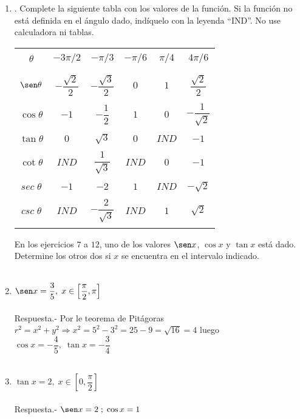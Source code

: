\begin{enumerate}
\item . Complete la siguiente tabla con los valores de la función. Si la función no está definida en el ángulo dado, indíquelo con la leyenda “IND”. No use calculadora ni tablas.
    \begin{center}
	\begin{tabular}{cccccc}
	    \hline\\
	    $\theta$&$-3\pi/2$&$-\pi/3$&$-\pi/6$&$\pi/4$&$4\pi/6$\\\\
	    \hline\\
	    $\sen \theta$&$-\dfrac{\sqrt{2}}{2}$&$-\dfrac{\sqrt{3}}{2}$&$0$&$1$&$\dfrac{\sqrt{2}}{2}$\\\\
	    $\cos \theta$&$-1$&$-\dfrac{1}{2}$&$1$&$0$&$-\dfrac{1}{\sqrt{2}}$\\\\
	    $\tan \theta$&$0$&$\sqrt{3}$&$0$&$IND$&$-1$\\\\
	    $\cot \theta$&$IND$&$\dfrac{1}{\sqrt{3}}$&$IND$&$0$&$-1$\\\\
	    $sec\; \theta$&$-1$&$-2$&$1$&$IND$&$-\sqrt{2}$\\\\
	    $csc\; \theta$&$IND$&$-\dfrac{2}{\sqrt{3}}$&$IND$&$1$&$\sqrt{2}$\\\\
	    \hline
	\end{tabular}
    \end{center}

En los ejercicios $7$ a $12$, uno de los valores $\sen x$, $\cos x$ y $\tan x$ está dado. Determine los otros dos si $x$ se encuentra en el intervalo indicado.\\\\

\item $\sen x = \dfrac{3}{5}, \; x \in \left[\dfrac{\pi}{2},\pi\right]$\\\\
    Respuesta.-\; Por le teorema de Pitágoras  $r^2=x^2+y^2 \Longrightarrow x^2 = 5^2 - 3^2 = 25 - 9 = \sqrt{16}=4$ luego $\cos x = - \dfrac{4}{5}, \;\tan x = -\dfrac{3}{4}$\\\\

\item $\tan x = 2, \; x\in \left[0,\dfrac{\pi}{2}\right]$\\\\
    Respuesta.-\; $\sen x = 2 \; ; \; \cos x = 1$\\\\


\end{enumerate}
